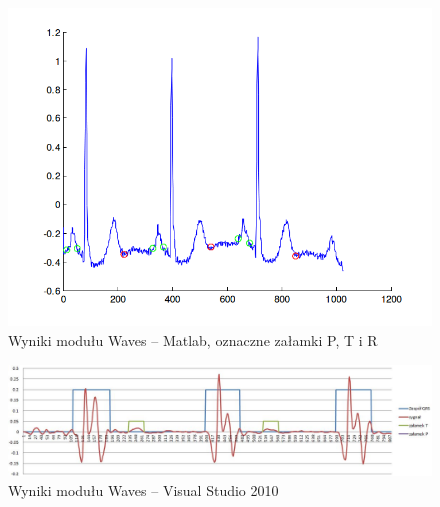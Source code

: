 \documentclass[a4paper, 11pt]{article}
\begin{document}
\begin{center}
%
\begin{figure}
\begin{centering}
\includegraphics[scale=0.4]{include/waves_matlab2}
\par\end{centering}

\caption{Wyniki modułu Waves -- Matlab, oznaczne załamki P, T i R }
\label{fig:waves_matlab2}
\end{figure}

\par\end{center}

\begin{center}
%
\begin{figure}
\begin{centering}
\includegraphics[scale=0.4]{include/waves_cpp}
\par\end{centering}

\caption{Wyniki modułu Waves -- Visual Studio 2010}
\label{fig:waves_cpp}
\end{figure}

\par\end{center}
\end{document}
